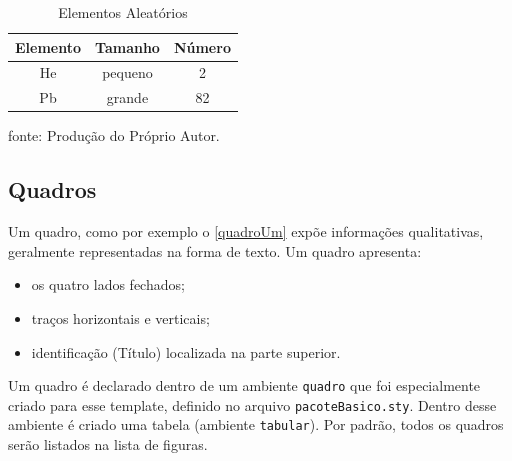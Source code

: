 \documentclass[
  12pt,		%
  a4paper,	%
  openright,%
  oneside,	%
  chapter=TITLE,		%
  section=TITLE,		%
  english,	%
  french,	%
  spanish,	%
  brazil
]{abntex2}
\begin{document}
                \begin{table}[h]
                    \centering
                    \caption{Elementos Aleatórios}
                    \begin{tabular}{ccc}
                        \hline
                        \multicolumn{1}{|c|}{Elemento} & \multicolumn{1}{c|}{Tamanho} & \multicolumn{1}{c|}{Número}\\
                        \hline
                        He & pequeno & 2 \\
                        Pb & grande & 82 \\
                        \hline
                    \end{tabular}
                    \par
                    {\small fonte: Produção do Próprio Autor.}
                \end{table}
            
            \subsection {Quadros}
                
                Um quadro, como por exemplo o \ref{quadroUm} expõe informações qualitativas, geralmente representadas na forma de texto. Um quadro apresenta:
                
                \begin{itemize}
                    \item os quatro lados fechados;
                    \item traços horizontais e verticais;
                    \item identificação (Título) localizada na parte superior.
                \end{itemize}
                
                Um quadro é declarado dentro de um ambiente \verb|quadro| que foi especialmente criado para esse template, definido no arquivo \verb|pacoteBasico.sty|. Dentro desse ambiente é criado uma tabela (ambiente \verb|tabular|). Por padrão, todos os quadros serão listados na lista de figuras.
\end{document}
